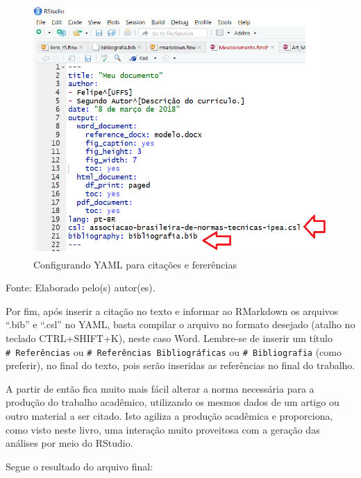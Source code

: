 \documentclass[12pt,portuguese,oneside]{book}
\begin{document}
\begin{figure}[H]

{\centering \includegraphics[width=0.8\linewidth]{rmarkcitar1} 

}

\caption{Configurando YAML para citações e fererências}\label{fig:rmarkcitar1}
\end{figure}

Fonte: Elaborado pelo(s) autor(es).

Por fim, após inserir a citação no texto e informar ao RMarkdown os
arquivos ``.bib'' e ``.csl'' no YAML, basta compilar o arquivo no
formato desejado (atalho no teclado CTRL+SHIFT+K), neste caso Word.
Lembre-se de inserir um título \texttt{\#\ Referências} ou
\texttt{\#\ Referências\ Bibliográficas} ou \texttt{\#\ Bibliografia}
(como preferir), no final do texto, pois serão inseridas as referências
no final do trabalho.

A partir de então fica muito mais fácil alterar a norma necessária para
a produção do trabalho acadêmico, utilizando os mesmos dados de um
artigo ou outro material a ser citado. Isto agiliza a produção acadêmica
e proporciona, como visto neste livro, uma interação muito proveitosa
com a geração das análises por meio do RStudio.

Segue o resultado do arquivo final:
\end{document}
